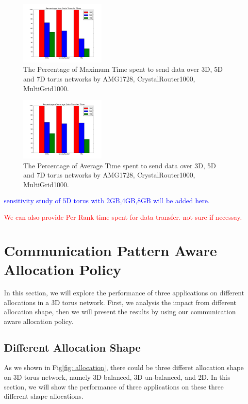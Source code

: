\documentclass[conference]{IEEEtran}
\begin{document}
\begin{figure}[h!] 
  \centering
  \includegraphics[width=0.38\textwidth]{figs/dimenstudy/maxtime}
   \caption{The Percentage of Maximum Time spent to send data over 3D, 5D and 7D torus networks by AMG1728, CrystalRouter1000, MultiGrid1000.}
   \label{fig: dimenstudy-maxtime}
\end{figure}

\begin{figure}[h!] 
  \centering
  \includegraphics[width=0.38\textwidth]{figs/dimenstudy/avgtime}
   \caption{The Percentage of Average Time spent to send data over 3D, 5D and 7D torus networks by AMG1728, CrystalRouter1000, MultiGrid1000.}
   \label{fig: dimenstudy-avgtime}
\end{figure}

\textcolor{blue}{sensitivity study of 5D torus with 2GB,4GB,8GB will be added here. }


\textcolor{red}{We can also provide Per-Rank time spent for data transfer. not sure if necessay.}


\section{Communication Pattern Aware Allocation Policy }
In this section, we will explore the performance of three applications on different allocations in a 3D torus network. First, we analysis the impact from different allocation shape, then we will present the results by using our communication aware allocation policy.  

\subsection{Different Allocation Shape}
As we shown in Fig\ref{fig: allocation}, there could be three differet allocation shape on 3D torus network, namely 3D balanced, 3D un-balanced, and 2D. In this section, we will show the performance of three applications on these three different shape allocations.
\end{document}
